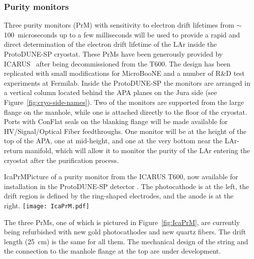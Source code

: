 \subsubsection{Purity monitors} 
Three purity monitors (PrM) with sensitivity
to electron drift lifetimes from $\sim$100~microseconds up to a few milliseconds
will be used to provide a rapid and direct determination of the 
electron drift lifetime
of the LAr inside the ProtoDUNE-SP cryostat. These PrMs have been generously provided by ICARUS~\cite{Amerio:2004ze} 
after being decommissioned from the T600. 
The design has been replicated with small modifications
for MicroBooNE and 
a number of  R\&D test experiments at Fermilab. Inside the ProtoDUNE-SP the monitors are arranged in a vertical 
column
located behind the APA planes on the Jura side (see Figure~\ref{fig:cryo-side-names}). 
Two of the monitors are supported from the large flange on the manhole, while one is attached directly to the floor of the cryostat.
Ports
 with ConFlat seals on the blanking flange will be made available for
 HV/Signal/Optical Fiber feedthroughs.
 One monitor will be at the height of the top of the APA,
 one at mid-height, and one at the very bottom near the LAr-return manifold, %
which will allow it to monitor
the purity of the LAr entering the cryostat after the purification process.  

\begin{cdrfigure}{IcaPrM}{Picture of a purity monitor from the ICARUS T600, now available for installation in the ProtoDUNE-SP detector
. The photocathode is at the left, the drift region is defined by the ring-shaped electrodes, and the anode is at the right.}
\texttt{[image: IcaPrM.pdf]} 
\end{cdrfigure}

The three PrMs, one of which is pictured in Figure~\ref{fig:IcaPrM}, are currently being refurbished with new gold photocathodes and new quartz fibers. The drift length  (25~cm) is the same for all them. 
The mechanical  design of the string and the connection to the manhole flange at the top 
are under development.

